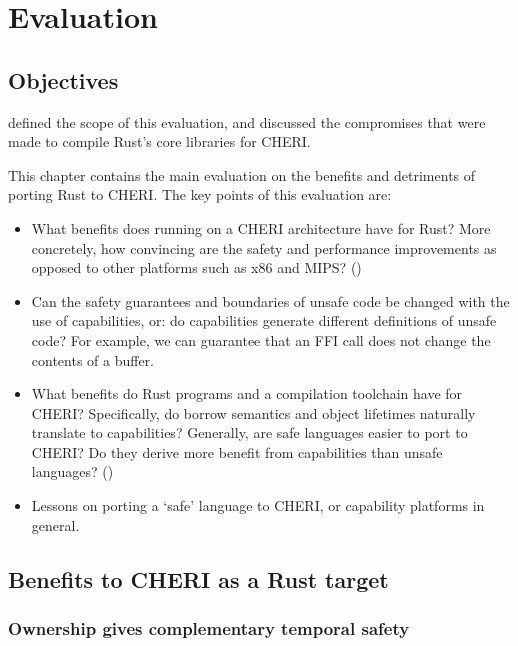 \documentclass[dissertation.tex]{subfiles}
\begin{document}
\chapter{Evaluation}
\label{ch:eval}

\section{Objectives}
 defined the scope of this evaluation, and
discussed the compromises that were made to compile Rust's core
libraries for CHERI.

This chapter contains the main evaluation on the benefits and detriments
of porting Rust to CHERI.
The key points of this evaluation are:

\begin{itemize}
    \item What benefits does running on a CHERI architecture have for Rust?
    More concretely, how convincing are the safety and performance
    improvements as opposed to other platforms such as x86 and MIPS?
    ()
    \item Can the safety guarantees and boundaries of unsafe code be
    changed with the use of capabilities, or: do capabilities generate
    different definitions of unsafe code?
    For example, we can guarantee that an FFI call does not change the
    contents of a buffer.
    \item What benefits do Rust programs and a compilation toolchain
    have for CHERI?
    Specifically, do borrow semantics and object lifetimes naturally
    translate to capabilities?
    Generally, are safe languages easier to port to CHERI? Do they
    derive more benefit from capabilities than unsafe languages?
    ()
    \item Lessons on porting a `safe' language to CHERI, or capability
    platforms in general. 
\end{itemize}


\section{Benefits to CHERI as a Rust target}
\label{sec:eval-cheri}

\subsection{Ownership gives complementary temporal safety}
\label{sec:eval-cheri-spatial-temporal}
\end{document}
